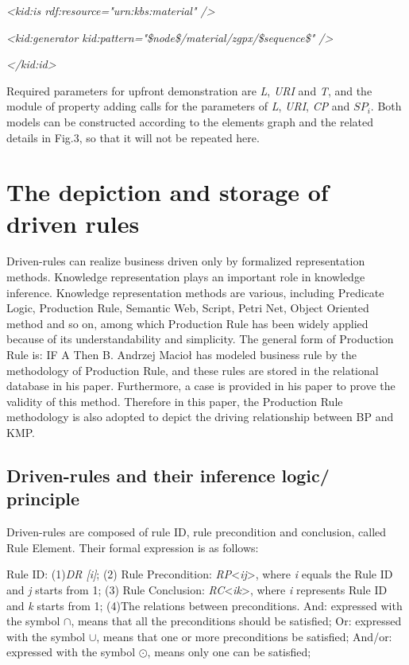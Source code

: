 \documentclass{elsarticle}
\begin{document}
{\itshape
{\textless}kid:is
rdf:resource="urn:kbs:material"
/{\textgreater}}

{\itshape
{\textless}kid:generator
kid:pattern="\$node\$/material/zgpx/\$sequence\$"
/{\textgreater}}

{\itshape
{\textless}/kid:id{\textgreater}}


\textrm{Required parameters for upfront demonstration are
}\textrm{\textit{L}}\textrm{, }\textrm{\textit{URI}}\textrm{ and
}\textrm{\textit{T}}\textrm{, and the module of property adding calls
for the parameters of}\textrm{\textit{ L}}\textrm{,
}\textrm{\textit{URI}}\textrm{, }\textrm{\textit{CP}}\textrm{ and
}$SP_i$\textrm{. Both models can be constructed
according to the elements graph and the related details in Fig.3, so
that it will not be repeated here.}

\section{The depiction and storage of driven
rules}
\label{sec:depict-stor-driv-1}

\textrm{Driven-rules can realize business driven only by formalized
representation methods. Knowledge representation plays an important
role in knowledge inference. Knowledge representation methods are
various, including Predicate Logic, Production Rule, Semantic Web,
Script, Petri Net, Object }\textrm{Oriented method and so on, among
which Production Rule has been widely applied because of its
understandability and simplicity\cite{wen2008mobile}. The general form of Production Rule
is: IF A Then B. Andrzej Macioł has modeled business rule by the
methodology of Production Rule, and these rules are stored in the
relational database in his paper. Furthermore, a case is provided in
his paper to prove the validity of this method\cite{maciol2008application}. Therefore in this
paper, the Production Rule methodology is also adopted to depict the
driving relationship between BP and KMP.}

\subsection{ Driven-rules and their inference logic/ principle}
\label{sec:driven-rules-their-1}
Driven-rules are composed of rule ID, rule precondition and conclusion,
called Rule Element. Their formal expression is as follows:


\textrm{Rule ID: }(1)\textrm{\textit{DR [i]}}\textrm{; (2) Rule
Precondition: }\textrm{\textit{RP}}\textrm{
{\textless}}\textrm{\textit{ij}}\textrm{{\textgreater},
where}\textrm{\textit{ i}}\textrm{ equals the Rule ID
and}\textrm{\textit{ j }}\textrm{starts from 1;}
(3) Rule Conclusion: \textrm{\textit{RC}}\textrm{
{\textless}}\textrm{\textit{ik}}\textrm{{\textgreater}, where
}\textrm{\textit{i}}\textrm{ represents Rule ID and }\textrm{\textit{k
}}\textrm{starts from 1; (4)The relations between preconditions.
And: expressed with the symbol ${\cap}$, means that all the
preconditions should be satisfied; Or: expressed with the symbol
${\cup}$, means that one or more preconditions be satisfied; And/or:
expressed with the symbol ${\odot}$, means only one can be satisfied;}
\end{document}

